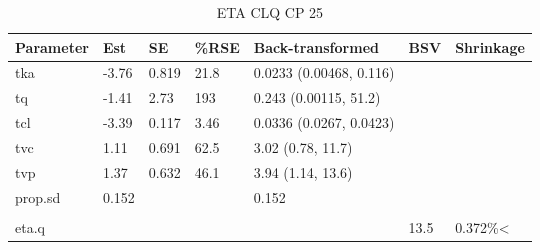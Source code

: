 \begin{table}
\centering\centering
\caption{ETA CLQ CP 25}
\centering
\fontsize{8}{10}\selectfont
\begin{tabular}[t]{lllllll}
\toprule
\textbf{Parameter} & \textbf{Est} & \textbf{SE} & \textbf{\%RSE} & \textbf{Back-transformed} & \textbf{BSV} & \textbf{Shrinkage}\\
\midrule
tka & -3.76 & 0.819 & 21.8 & 0.0233 (0.00468, 0.116) &  & \\
\midrule
tq & -1.41 & 2.73 & 193 & 0.243 (0.00115, 51.2) &  & \\
\midrule
tcl & -3.39 & 0.117 & 3.46 & 0.0336 (0.0267, 0.0423) &  & \\
\midrule
tvc & 1.11 & 0.691 & 62.5 & 3.02 (0.78, 11.7) &  & \\
\midrule
tvp & 1.37 & 0.632 & 46.1 & 3.94 (1.14, 13.6) &  & \\
\midrule
prop.sd & 0.152 &  &  & 0.152 &  & \\
\midrule\\
eta.q &  &  &  &  & 13.5 & 0.372\%<\\
\bottomrule
\end{tabular}
\end{table}